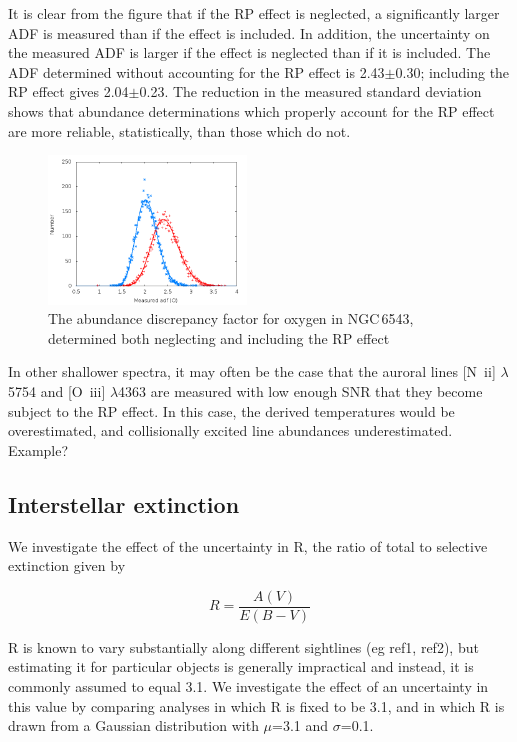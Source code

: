 \documentclass[useAMS,usenatbib]{mn2e}
\begin{document}
It is clear from the figure that if the RP effect is neglected, a significantly larger ADF is measured than if the effect is included.  In addition, the uncertainty on the measured ADF is larger if the effect is neglected than if it is included.  The ADF determined without accounting for the RP effect is 2.43$\pm$0.30; including the RP effect gives 2.04$\pm$0.23.  The reduction in the measured standard deviation shows that abundance determinations which properly account for the RP effect are more reliable, statistically, than those which do not.

\begin{figure}
\label{RPeffect}
\includegraphics[width=0.47\textwidth]{figures/RPeffect.png}
\caption{The abundance discrepancy factor for oxygen in NGC\,6543, determined both neglecting and including the RP effect}
\end{figure}

In other shallower spectra, it may often be the case that the auroral lines [N~{\sc ii}] $\lambda$5754 and [O~{\sc iii}] $\lambda$4363 are measured with low enough SNR that they become subject to the RP effect.  In this case, the derived temperatures would be overestimated, and collisionally excited line abundances underestimated.  Example?

\subsection{Interstellar extinction}
\label{extinction}

We investigate the effect of the uncertainty in R, the ratio of total to selective extinction given by

\begin{equation}
R = \frac{A(V)}{E(B-V)}
\end{equation}

R is known to vary substantially along different sightlines (eg ref1, ref2), but estimating it for particular objects is generally impractical and instead, it is commonly assumed to equal 3.1.  We investigate the effect of an uncertainty in this value by comparing analyses in which R is fixed to be 3.1, and in which R is drawn from a Gaussian distribution with $\mu$=3.1 and $\sigma$=0.1.
\end{document}
